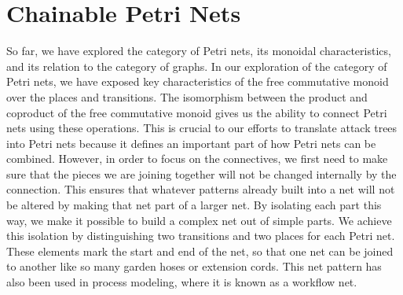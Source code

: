 \section{Chainable Petri Nets}
So far, we have explored the category of Petri nets, its monoidal characteristics, and its relation to the category of graphs. In our exploration of the category of Petri nets, we have exposed key characteristics of the free commutative monoid over the places and transitions. The isomorphism between the product and coproduct of the free commutative monoid gives us the ability to connect Petri nets using these operations. This is crucial to our efforts to translate attack trees into Petri nets because it defines an important part of how Petri nets can be combined. However, in order to focus on the connectives, we first need to make sure that the pieces we are joining together will not be changed internally by the connection. This ensures that whatever patterns already built into a net will not be altered by making that net part of a larger net. By isolating each part this way, we make it possible to build a complex net out of simple parts. We achieve this isolation by distinguishing two transitions and two places for each Petri net. These elements mark the start and end of the net, so that one net can be joined to another like so many garden hoses or extension cords. This net pattern has also been used in process modeling, where it is known as a workflow net. 
